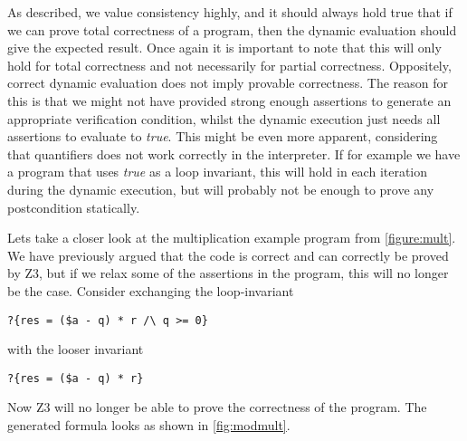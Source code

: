 As described, we value consistency highly, and it should always hold true that if we can prove total correctness of a program, then the dynamic evaluation should give the expected result. Once again it is important to note that this will only hold for total correctness and not necessarily for partial correctness.
Oppositely, correct dynamic evaluation does not imply provable correctness.
The reason for this is that we might not have provided strong enough assertions to generate an appropriate verification condition, whilst the dynamic execution just needs all assertions to evaluate to \textit{true}. 
This might be even more apparent, considering that quantifiers does not work correctly in the interpreter.
If for example we have a program that uses \textit{true} as a loop invariant, this will hold in each iteration during the dynamic execution, but will probably not be enough to prove any postcondition statically.

Lets take a closer look at the multiplication example program from \cref{figure:mult}. 
% 
We have previously argued that the code is correct and can correctly be proved by Z3, but if we relax some of the assertions in the program, this will no longer be the case.
Consider exchanging the loop-invariant 
\begin{verbatim}
?{res = ($a - q) * r /\ q >= 0}
\end{verbatim}
 with the looser invariant 
\begin{verbatim}
?{res = ($a - q) * r}
\end{verbatim}
Now Z3 will no longer be able to prove the correctness of the program. The generated formula looks as shown in \cref{fig:modmult}.

